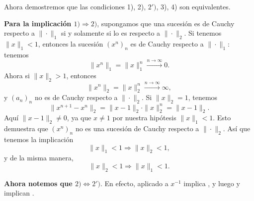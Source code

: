 \documentclass{article}
\numberwithin{equation}{section}
\theoremstyle{definition}
\begin{document}
Ahora demostremos que las condiciones 1), 2), $2')$, 3), 4) son equivalentes.

\vspace{1em}

\noindent\textbf{Para la implicación $1) \Rightarrow 2)$}, supongamos que una
sucesión es de Cauchy respecto a $\|\cdot\|_1$ si y solamente si lo es respecto
a $\|\cdot\|_2$. Si tenemos $\|x\|_1 < 1$, entonces la sucesión $(x^n)_n$ es de
Cauchy respecto a $\|\cdot\|_1$: tenemos
$$\|x^n\|_1 = \|x\|^n_1 \xrightarrow{n\to\infty} 0.$$
Ahora si $\|x\|_2 > 1$, entonces
$$\|x^n\|_2 = \|x\|^n_2 \xrightarrow{n\to\infty} \infty,$$
y $(a_n)_n$ no es de Cauchy respecto a $\|\cdot\|_2$. Si $\|x\|_2 = 1$, tenemos
$$\|x^{n+1} - x^n\|_2 = \|x-1\|_2 \cdot \|x\|^n_2 = \|x-1\|_2.$$
Aquí $\|x-1\|_2 \ne 0$, ya que $x\ne 1$ por nuestra hipótesis
$\|x\|_1 < 1$. Esto demuestra que $(x^n)_n$ no es una sucesión de Cauchy
respecto a $\|\cdot\|_2$. Así que tenemos la implicación
$$\|x\|_1 < 1 \Longrightarrow \|x\|_2 < 1,$$
y de la misma manera,
$$\|x\|_2 < 1 \Longrightarrow \|x\|_1 < 1.$$

\vspace{1em}

\noindent\textbf{Ahora notemos que $2) \Leftrightarrow 2')$}. En efecto,
 aplicado a $x^{-1}$ implica
, y luego
 y 
implican .

\vspace{1em}
\end{document}
